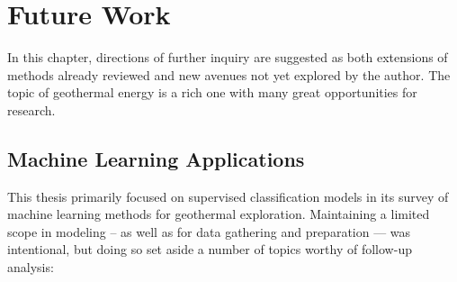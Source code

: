 \chapter{Future Work}
\label{ch9:future_work}

In this chapter, directions of further inquiry are suggested as both extensions of methods already reviewed and new avenues not yet explored by the author. The topic of geothermal energy is a rich one with many great opportunities for research.

\section{Machine Learning Applications}
\label{ch9:future_work_ml}

This thesis primarily focused on supervised classification models in its survey of machine learning methods for geothermal exploration. Maintaining a limited scope in modeling -- as well as for data gathering and preparation --- was intentional, but doing so set aside a number of topics worthy of follow-up analysis:

